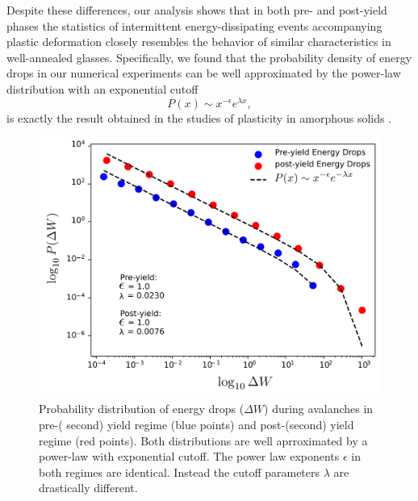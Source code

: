 \documentclass[aps,
superscriptaddress,notitlepage]{revtex4-1}
\begin{document}
Despite these differences, our analysis  shows  that in both pre- and post-yield phases the statistics of  intermittent energy-dissipating  events  accompanying plastic
deformation  closely resembles the behavior of similar characteristics in well-annealed glasses. Specifically, we found that the probability density of energy drops  in our numerical experiments can be   well approximated by the power-law distribution with an exponential cutoff   
\begin{equation}
P(x)  \sim  x^{-\epsilon}e^{\lambda x},
\end{equation}
is exactly the result obtained in the studies of  plasticity in amorphous solids  \cite{Papanikolaou2017-ld,Weiss2021-tt,Sethna2001,Ispanovity2014-ra,Alava2014,Lehtinen2016-qy}.
\begin{figure}[h!]
\includegraphics[scale=.11]{figures_ordering/figure_17.pdf}
\caption{Probability distribution of energy drops ($\Delta W$) during avalanches in pre-( second) yield regime (blue points) and post-(second) yield regime (red points). Both distributions are well aprroximated by a power-law with exponential cutoff.  The power law exponents $\epsilon$ in both regimes are identical. Instead the  cutoff parameters  $\lambda$  are drastically different. }\label{fig:energy_drops}
\end{figure}
\end{document}

